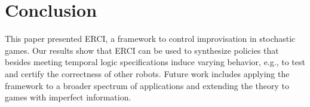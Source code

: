 \section{Conclusion}
This paper presented ERCI, a framework to control improvisation in stochastic games. Our results show that ERCI can be used to synthesize policies that besides meeting temporal logic specifications induce varying behavior, e.g., to test and certify the correctness of other robots. Future work includes applying the framework to a broader spectrum of applications and extending the theory to games with imperfect information.